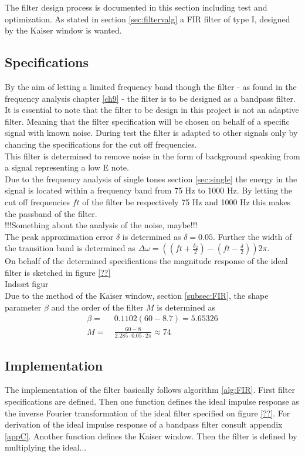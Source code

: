 The filter design process is documented in this section including test and optimization. As stated in section \ref{sec:filtervalg} a FIR filter of type I, designed by the Kaiser window is wanted.
\subsection{Specifications}\label{sec:FIRspec} 
By the aim of letting a limited frequency band though the filter - as found in the frequency analysis chapter \ref{ch9} - the filter is to be designed as a bandpass filter. It is essential to note that the filter to be design in this project is not an adaptive filter. Meaning that the filter specification will be chosen on behalf of a specific signal with known noise. During test the filter is adapted to other signals only by chancing the specifications for the cut off frequencies.\\
This filter is determined to remove noise in the form of background speaking from a signal representing a low E note. \\
Due to the frequency analysis of single tones section \ref{sec:single} the energy in the signal is located within a frequency band from 75 Hz to 1000 Hz.  
By letting the cut off frequencies $ft$ of the filter be respectively 75 Hz and 1000 Hz this makes the passband of the filter. 
\\
!!!Something about the analysis of the noise, maybe!!!\\

The peak approximation error $\delta$ is determined as $\delta=0.05$. Further the width of the transition band is determined as $\Delta \omega = ((ft + \frac{\delta_2}{2})-(ft - \frac{\delta}{2}))2\pi$.\\
On behalf of the determined specifications the magnitude response of the ideal filter is sketched in figure \ref{??}   
\\ Indsæt figur \\ 
Due to the method of the Kaiser window, section \ref{subsec:FIR}, the shape parameter $\beta$ and the order of the filter $M$ is determined as  
\begin{align}
\beta =& \ 0.1102(60-8.7) = 5.65326 \\
M =& \ \frac{60-8}{2.285\cdot 0.05\cdot 2\pi}\approx 74 
\end{align}
\subsection{Implementation}
The implementation of the filter basically follows algorithm \ref{alg:FIR}. First filter specifications are defined. Then one function defines the ideal impulse response as the inverse Fourier transformation of the ideal filter specified on figure \ref{??}. For derivation of the ideal impulse response of a bandpass filter consult appendix \ref{appC}. Another function defines the Kaiser window. Then the filter is defined by multiplying the ideal...

